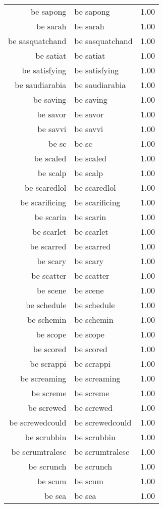 \begin{table}[ht]
\begin{tabular}{rlr}
  be sapong & be sapong & 1.00 \\ 
  be sarah & be sarah & 1.00 \\ 
  be sasquatchand & be sasquatchand & 1.00 \\ 
  be satiat & be satiat & 1.00 \\ 
  be satisfying & be satisfying & 1.00 \\ 
  be saudiarabia & be saudiarabia & 1.00 \\ 
  be saving & be saving & 1.00 \\ 
  be savor & be savor & 1.00 \\ 
  be savvi & be savvi & 1.00 \\ 
  be sc & be sc & 1.00 \\ 
  be scaled & be scaled & 1.00 \\ 
  be scalp & be scalp & 1.00 \\ 
  be scaredlol & be scaredlol & 1.00 \\ 
  be scarificing & be scarificing & 1.00 \\ 
  be scarin & be scarin & 1.00 \\ 
  be scarlet & be scarlet & 1.00 \\ 
  be scarred & be scarred & 1.00 \\ 
  be scary & be scary & 1.00 \\ 
  be scatter & be scatter & 1.00 \\ 
  be scene & be scene & 1.00 \\ 
  be schedule & be schedule & 1.00 \\ 
  be schemin & be schemin & 1.00 \\ 
  be scope & be scope & 1.00 \\ 
  be scored & be scored & 1.00 \\ 
  be scrappi & be scrappi & 1.00 \\ 
  be screaming & be screaming & 1.00 \\ 
  be screme & be screme & 1.00 \\ 
  be screwed & be screwed & 1.00 \\ 
  be screwedcould & be screwedcould & 1.00 \\ 
  be scrubbin & be scrubbin & 1.00 \\ 
  be scrumtralesc & be scrumtralesc & 1.00 \\ 
  be scrunch & be scrunch & 1.00 \\ 
  be scum & be scum & 1.00 \\ 
  be sea & be sea & 1.00 \\ 

\end{tabular}
\end{table}
